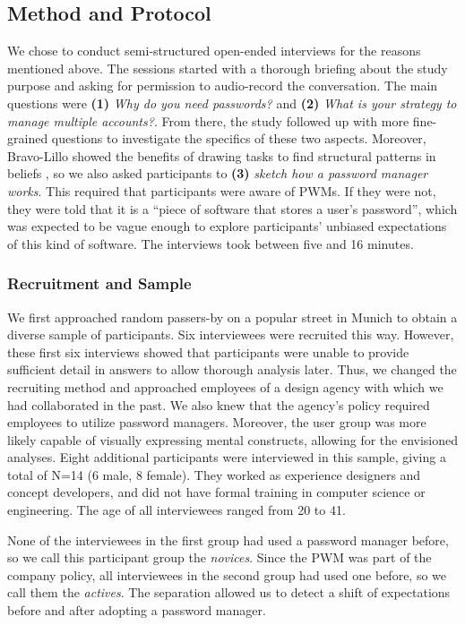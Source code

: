 \subsection{Method and Protocol}
We chose to conduct semi-structured open-ended interviews for the reasons mentioned above. The sessions started with a thorough briefing about the study purpose and asking for permission to audio-record the conversation. The main questions were \textbf{(1)} \textit{Why do you need passwords?} and \textbf{(2)} \textit{What is your strategy to manage multiple accounts?}. From there, the study followed up with more fine-grained questions to investigate the specifics of these two aspects. Moreover, Bravo-Lillo \etal showed the benefits of drawing tasks to find structural patterns in beliefs \cite{BravoLillo2011WarningsMentalModel}, so we also asked participants to \textbf{(3)} \textit{sketch how a password manager works}. This required that participants were aware of \glspl{PWM}. If they were not, they were told that it is a ``piece of software that stores a user's password'', which was expected to be vague enough to explore participants' unbiased expectations of this kind of software. The interviews took between five and 16 minutes. 

\subsubsection{Recruitment and Sample}
We first approached random passers-by on a popular street in Munich to obtain a diverse sample of participants. Six interviewees were recruited this way. However, these first six interviews showed that participants were unable to provide sufficient detail in answers to allow thorough analysis later. Thus, we changed the recruiting method and approached employees of a design agency with which we had collaborated in the past. We also knew that the agency's policy required employees to utilize password managers. Moreover, the user group was more likely capable of visually expressing mental constructs, allowing for the envisioned analyses. Eight additional participants were interviewed in this sample, giving a total of N=14 (6 male, 8 female). They worked as experience designers and concept developers, and did not have formal training in computer science or engineering. The age of all interviewees ranged from 20 to 41.

None of the interviewees in the first group had used a password manager before, so we call this participant group the \textit{novices}. Since the \gls{PWM} was part of the company policy, all interviewees in the second group had used one before, so we call them the \textit{actives}. The separation allowed us to detect a shift of expectations before and after adopting a password manager. 

